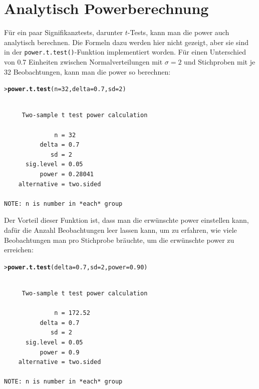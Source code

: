 \documentclass[oneside, 10pt]{book}\usepackage[]{graphicx}\usepackage[]{xcolor}
\makeatletter
\newcommand{\hlnum}[1]{\textcolor[rgb]{0.686,0.059,0.569}{#1}}%
\newcommand{\hlstd}[1]{\textcolor[rgb]{0.345,0.345,0.345}{#1}}%
\newcommand{\hlkwc}[1]{\textcolor[rgb]{0.333,0.667,0.333}{#1}}%
\newcommand{\hlkwd}[1]{\textcolor[rgb]{0.737,0.353,0.396}{\textbf{#1}}}%
\newenvironment{kframe}{%
 \def\at@end@of@kframe{}%
 \ifinner\ifhmode%
  \def\at@end@of@kframe{\end{minipage}}%
  \begin{minipage}{\columnwidth}%
 \fi\fi%
 \def\FrameCommand##1{\hskip\@totalleftmargin \hskip-\fboxsep
 \colorbox{shadecolor}{##1}\hskip-\fboxsep
     \hskip-\linewidth \hskip-\@totalleftmargin \hskip\columnwidth}%
 \MakeFramed {\advance\hsize-\width
   \@totalleftmargin\z@ \linewidth\hsize
   \@setminipage}}%
 {\par\unskip\endMakeFramed%
 \at@end@of@kframe}
\newenvironment{knitrout}{}{} %
\makeatother
\begin{document}
\section{Analytisch Powerberechnung}
Für ein paar Signifikanztests, darunter $t$-Tests, kann man
die power auch analytisch berechnen. Die Formeln
dazu werden hier nicht gezeigt, aber sie sind in der 
\texttt{power.t.test()}-Funktion
implementiert worden. Für einen Unterschied von 0.7 Einheiten
zwischen Normalverteilungen mit $\sigma = 2$ und
Stichproben mit je 32 Beobachtungen, kann man die power
so berechnen:
\begin{knitrout}
\color{fgcolor}\begin{kframe}
\begin{alltt}
\hlstd{> }\hlkwd{power.t.test}\hlstd{(}\hlkwc{n} \hlstd{=} \hlnum{32}\hlstd{,} \hlkwc{delta} \hlstd{=} \hlnum{0.7}\hlstd{,} \hlkwc{sd} \hlstd{=} \hlnum{2}\hlstd{)}
\end{alltt}
\begin{verbatim}

     Two-sample t test power calculation 

              n = 32
          delta = 0.7
             sd = 2
      sig.level = 0.05
          power = 0.28041
    alternative = two.sided

NOTE: n is number in *each* group
\end{verbatim}
\end{kframe}
\end{knitrout}

Der Vorteil dieser Funktion ist, dass man die erwünschte power
einstellen kann, dafür die Anzahl Beobachtungen leer lassen kann, um zu
erfahren, wie viele Beobachtungen man pro Stichprobe bräuchte,
um die erwünschte power zu erreichen:
\begin{knitrout}
\color{fgcolor}\begin{kframe}
\begin{alltt}
\hlstd{> }\hlkwd{power.t.test}\hlstd{(}\hlkwc{delta} \hlstd{=} \hlnum{0.7}\hlstd{,} \hlkwc{sd} \hlstd{=} \hlnum{2}\hlstd{,} \hlkwc{power} \hlstd{=} \hlnum{0.90}\hlstd{)}
\end{alltt}
\begin{verbatim}

     Two-sample t test power calculation 

              n = 172.52
          delta = 0.7
             sd = 2
      sig.level = 0.05
          power = 0.9
    alternative = two.sided

NOTE: n is number in *each* group
\end{verbatim}
\end{kframe}
\end{knitrout}
\end{document}
